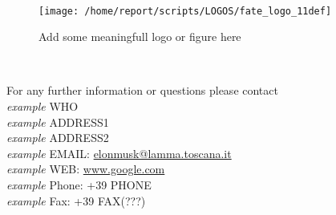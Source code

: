 
\clearpage
\begin{center}
\HRule \\[0.4cm]
\begin{figure}[htbp]
\centering
{\texttt{[image: /home/report/scripts/LOGOS/fate\_logo\_11def]}}
\caption{Add some meaningfull logo or figure here}
\end{figure}
\HRule \\[0.4cm]
\end{center}

\vspace{5.55cm}
\begin{flushright}
\large{For any further information or questions please contact
\\\textit{example} WHO
\\\textit{example} ADDRESS1
\\\textit{example} ADDRESS2
\\\textit{example} EMAIL: \href{mailto:elonmusk@lamma.toscana.it}{elonmusk@lamma.toscana.it}
\\\textit{example} WEB: \href{www.google.com}{www.google.com}
\\\textit{example} Phone: +39 PHONE
\\\textit{example} Fax: +39 FAX(???)}
\end{flushright}




